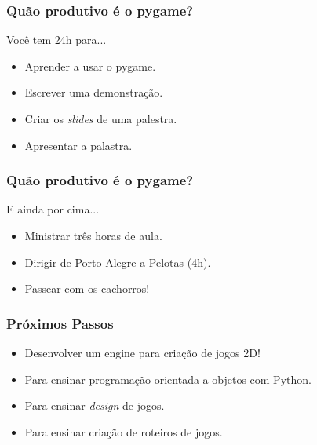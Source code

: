 \begin{frame}
    \frametitle{Quão produtivo é o pygame?}

    \vfill
    \begin{center}
        Você tem 24h para...
        \begin{itemize}
            \item Aprender a usar o pygame.
            \item Escrever uma demonstração.
            \item Criar os \textit{slides} de uma palestra.
            \item Apresentar a palastra.
        \end{itemize}
    \end{center}
    \vfill
\end{frame}

\begin{frame}
    \frametitle{Quão produtivo é o pygame?}

    \vfill
    \begin{center}
        E ainda por cima...
        \begin{itemize}
            \item Ministrar três horas de aula.
            \item Dirigir de Porto Alegre a Pelotas (4h).
            \vfill
            \item Passear com os cachorros!
        \end{itemize}
    \end{center}
    \vfill
\end{frame}




\begin{frame}
    \frametitle{Próximos Passos}

    \begin{itemize}
        \item Desenvolver um engine para criação de jogos 2D!
        \item Para ensinar programação orientada a objetos com Python.
        \item Para ensinar \textit{design} de jogos.
        \item Para ensinar criação de roteiros de jogos.
    \end{itemize}
\end{frame}







